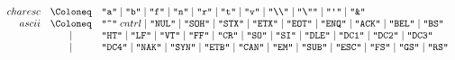 \begin{align*}
\begin{array}{rcl}
    {charesc}
    & \Coloneq & \text{\texttt{\textquotedbl a\textquotedbl}}
    \mid \text{\texttt{\textquotedbl b\textquotedbl}}
    \mid \text{\texttt{\textquotedbl f\textquotedbl}}
    \mid \text{\texttt{\textquotedbl n\textquotedbl}}
    \mid \text{\texttt{\textquotedbl r\textquotedbl}}
    \mid \text{\texttt{\textquotedbl t\textquotedbl}}
    \mid \text{\texttt{\textquotedbl v\textquotedbl}}
    \mid \text{\texttt{\textquotedbl\textbackslash\textbackslash\textquotedbl}}
    \mid \text{\texttt{\textquotedbl\textbackslash\textquotedbl\textquotedbl}}
    \mid \text{\texttt{\textquotedbl\textquotesingle\textquotedbl}}
    \mid \text{\texttt{\textquotedbl\&\textquotedbl}}
    \\
    {ascii}
    & \Coloneq & \text{\texttt{\textquotedbl\textasciicircum\textquotedbl}}\; {cntrl}
    \mid \text{\texttt{\textquotedbl NUL\textquotedbl}}
    \mid \text{\texttt{\textquotedbl SOH\textquotedbl}}
    \mid \text{\texttt{\textquotedbl STX\textquotedbl}}
    \mid \text{\texttt{\textquotedbl ETX\textquotedbl}}
    \mid \text{\texttt{\textquotedbl EOT\textquotedbl}}
    \mid \text{\texttt{\textquotedbl ENQ\textquotedbl}}
    \mid \text{\texttt{\textquotedbl ACK\textquotedbl}}
    \mid \text{\texttt{\textquotedbl BEL\textquotedbl}}
    \mid \text{\texttt{\textquotedbl BS\textquotedbl}}
    \\
    & \mid & \text{\texttt{\textquotedbl HT\textquotedbl}}
    \mid \text{\texttt{\textquotedbl LF\textquotedbl}}
    \mid \text{\texttt{\textquotedbl VT\textquotedbl}}
    \mid \text{\texttt{\textquotedbl FF\textquotedbl}}
    \mid \text{\texttt{\textquotedbl CR\textquotedbl}}
    \mid \text{\texttt{\textquotedbl SO\textquotedbl}}
    \mid \text{\texttt{\textquotedbl SI\textquotedbl}}
    \mid \text{\texttt{\textquotedbl DLE\textquotedbl}}
    \mid \text{\texttt{\textquotedbl DC1\textquotedbl}}
    \mid \text{\texttt{\textquotedbl DC2\textquotedbl}}
    \mid \text{\texttt{\textquotedbl DC3\textquotedbl}}
    \\
    & \mid & \text{\texttt{\textquotedbl DC4\textquotedbl}}
    \mid \text{\texttt{\textquotedbl NAK\textquotedbl}}
    \mid \text{\texttt{\textquotedbl SYN\textquotedbl}}
    \mid \text{\texttt{\textquotedbl ETB\textquotedbl}}
    \mid \text{\texttt{\textquotedbl CAN\textquotedbl}}
    \mid \text{\texttt{\textquotedbl EM\textquotedbl}}
    \mid \text{\texttt{\textquotedbl SUB\textquotedbl}}
    \mid \text{\texttt{\textquotedbl ESC\textquotedbl}}
    \mid \text{\texttt{\textquotedbl FS\textquotedbl}}
    \mid \text{\texttt{\textquotedbl GS\textquotedbl}}
    \mid \text{\texttt{\textquotedbl RS\textquotedbl}}

\end{array}
\end{align*}
